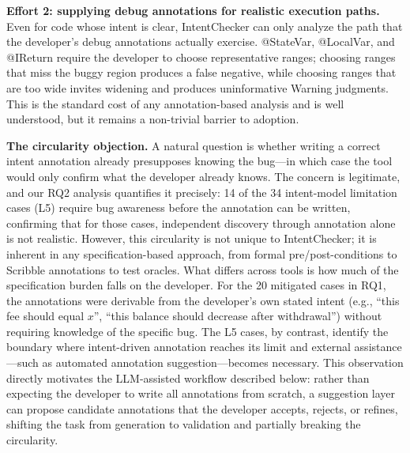 \documentclass[pdflatex,sn-basic]{sn-jnl}%
\theoremstyle{thmstyleone}%
\theoremstyle{thmstyletwo}%
\theoremstyle{thmstylethree}%
\begin{document}
\smallskip
\noindent\textbf{Effort 2: supplying debug annotations for realistic execution paths.}
Even for code whose intent is clear, IntentChecker can only analyze the path that the developer's debug annotations actually exercise.
@StateVar, @LocalVar, and @IReturn require the developer to choose representative ranges; choosing ranges that miss the buggy region produces a false negative, while choosing ranges that are too wide invites widening and produces uninformative Warning judgments.
This is the standard cost of any annotation-based analysis and is well understood, but it remains a non-trivial barrier to adoption.

\smallskip
\noindent\textbf{The circularity objection.}
A natural question is whether writing a correct intent annotation already presupposes knowing the bug---in which case the tool would only confirm what the developer already knows.
The concern is legitimate, and our RQ2 analysis quantifies it precisely: 14 of the 34 intent-model limitation cases (L5) require bug awareness before the annotation can be written, confirming that for those cases, independent discovery through annotation alone is not realistic.
However, this circularity is not unique to IntentChecker; it is inherent in any specification-based approach, from formal pre/post-conditions to Scribble annotations to test oracles.
What differs across tools is how much of the specification burden falls on the developer.
For the 20 mitigated cases in RQ1, the annotations were derivable from the developer's own stated intent (e.g., ``this fee should equal $x$'', ``this balance should decrease after withdrawal'') without requiring knowledge of the specific bug.
The L5 cases, by contrast, identify the boundary where intent-driven annotation reaches its limit and external assistance---such as automated annotation suggestion---becomes necessary.
This observation directly motivates the LLM-assisted workflow described below: rather than expecting the developer to write all annotations from scratch, a suggestion layer can propose candidate annotations that the developer accepts, rejects, or refines, shifting the task from generation to validation and partially breaking the circularity.
\end{document}

